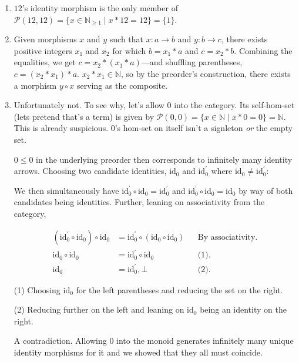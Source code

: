 \documentclass{article}
\begin{document}
\begin{enumerate}[label=(\alph*)]

\item $12$’s identity morphism is the only member of $\mathcal{P}(12, 12) = \{x \in \mathbb{N}_{\geq 1} \mid x * 12 = 12\} = \{1\}$.

\item Given morphisms $x$ and $y$ such that $x: a \rightarrow b$ and $y: b \rightarrow c$, there exists positive integers $x_{1}$ and $x_{2}$ for which $b = x_{1} * a$ and $c = x_{2} * b$. Combining the equalities, we get $c = x_{2} * (x_{1} * a)$—and shuffling parentheses, $c = (x_{2} * {x_1}) * a$. $x_{2} * {x_1} \in \mathbb{N}$, so by the preorder’s construction, there exists a morphism $y \circ x$ serving as the composite.

\item Unfortunately not. To see why, let’s allow $0$ into the category. Its self-hom-set (lets pretend that’s a term) is given by $\mathcal{P}(0, 0) = \{x \in \mathbb{N} \mid x * 0 = 0\} = \mathbb{N}$. This is already suspicious. $0$’s hom-set on itself isn’t a signleton \emph{or} the empty set.

$0 \leq 0$ in the underlying preorder then corresponds to infinitely many identity arrows. Choosing two candidate identities, $\textrm{id}_{0}$ and $\textrm{id}_{0}^\prime$ where $\textrm{id}_{0} \neq \textrm{id}_{0}^\prime$:

We then simultaneously have $\textrm{id}_{0}^\prime \circ \textrm{id}_{0} = \textrm{id}_{0}^\prime$ and $\textrm{id}_{0}^\prime \circ \textrm{id}_{0} = \textrm{id}_{0}$ by way of both candidates being identities. Further, leaning on associativity from the category,

\begin{align*}
    (\textrm{id}_{0}^\prime \circ \textrm{id}_{0}) \circ \textrm{id}_{0} &= \textrm{id}_{0}^\prime \circ (\textrm{id}_{0} \circ \textrm{id}_{0}) && \text{By associativity.} \\
    \textrm{id}_{0} \circ \textrm{id}_{0} &= \textrm{id}_{0}^\prime \circ \textrm{id}_{0} && \text{(1).} \\
    \textrm{id}_{0} &= \textrm{id}_{0}^\prime, \bot && \text{(2).}
\end{align*}

(1) Choosing $\textrm{id}_{0}$ for the left parentheses and reducing the set on the right.

(2) Reducing further on the left and leaning on  $\textrm{id}_{0}$ being an identity on the right.

A contradiction. Allowing $0$ into the monoid generates infinitely many unique identity morphisms for it and we showed that they all must coincide.

\end{enumerate}
\end{document}
